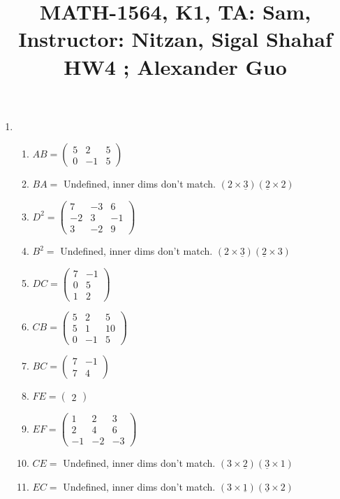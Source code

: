 \documentclass{article}
\title{\large{\vspace{-1.0cm}MATH-1564, K1, TA: Sam, Instructor: Nitzan, Sigal Shahaf \\ HW4 ; Alexander Guo}}
\date{}
\begin{document}
\maketitle

\vspace{-1.5cm}
\large

\begin{enumerate}

\item

\begin{enumerate}

\item $AB = \left(\begin{array}{ccc} 5 & 2 & 5 \\ 0 & -1 & 5 \end{array}\right)$
\item $BA =$ Undefined, inner dims don't match. $(2 \times \underline{3}) (\underline{2} \times 2)$
\item $D^{2} = \left(\begin{array}{ccc} 7 & -3 & 6 \\ -2 & 3 & -1 \\ 3 & -2 & 9 \end{array}\right)$ 
\item $B^{2} =$ Undefined, inner dims don't match.  $(2 \times \underline{3}) (\underline{2} \times 3)$
\item $DC = \left(\begin{array}{cc} 7 & -1 \\ 0 & 5 \\ 1 & 2 \end{array} \right)$
\item $CB = \left(\begin{array}{ccc} 5 & 2 & 5 \\ 5 & 1 & 10 \\ 0 & -1 & 5 \end{array} \right)$
\item $BC = \left(\begin{array}{cc} 7 & -1 \\ 7 & 4 \end{array} \right)$
\item $FE = \left(\begin{array}{c} 2 \end{array} \right)$
\item $EF = \left(\begin{array}{ccc} 1 & 2 & 3 \\ 2 & 4 & 6 \\ -1 & -2 & -3 \end{array} \right)$
\item $CE =$ Undefined, inner dims don't match.  $(3 \times \underline{2}) (\underline{3} \times 1)$
\item $EC =$ Undefined, inner dims don't match.  $(3 \times \underline{1}) (\underline{3} \times 2)$


\end{enumerate}
\end{enumerate}
\end{document}
